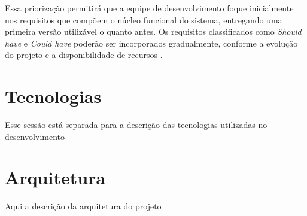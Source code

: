 Essa priorização permitirá que a equipe de desenvolvimento foque inicialmente nos requisitos que compõem o núcleo funcional do sistema, entregando uma primeira versão utilizável o quanto antes. Os requisitos classificados como \textit{Should have} e \textit{Could have} poderão ser incorporados gradualmente, conforme a evolução do projeto e a disponibilidade de recursos \cite{somerville2011engenharia}.


\section*{Tecnologias}
Esse sessão está separada para a descrição das tecnologias utilizadas no desenvolvimento


\section*{Arquitetura}
Aqui a descrição da arquitetura do projeto

